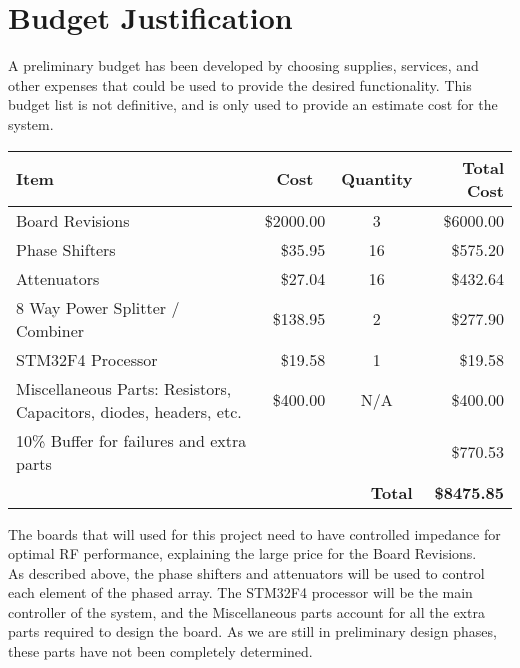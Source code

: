 \documentclass[UROP.tex]{subfiles}
\begin{document}
\bigskip
\section{\Large Budget Justification}
	A preliminary budget has been developed by choosing supplies, services, and other expenses that could be used to provide the desired functionality.  This budget list is not definitive, and is only used to provide an estimate cost for the system.\\
\begin{table}[H]
\doublespacing
\centering
\begin{tabular}{| p{7cm} | r | c | r |}
\hline
  Item & \multicolumn{1}{|c|}{Cost} & Quantity & Total Cost \\\hline\hline
  Board Revisions & \$2000.00 & 3 & \$6000.00  \\
  Phase Shifters & \$35.95 & 16 & \$575.20\\
  Attenuators & \$27.04 & 16 & \$432.64 \\
  8 Way Power Splitter / Combiner & \$138.95 & 2 & \$277.90 \\
  STM32F4 Processor & \$19.58 & 1 & \$19.58\\
  Miscellaneous Parts: Resistors, Capacitors, diodes, headers, etc. & \$400.00 & N/A & \$400.00\\
  10\% Buffer for failures and extra parts & & &\$770.53\\\hline
  \multicolumn{3}{r}{\textbf{Total}} & \multicolumn{1}{r}{\textbf{\$8475.85}}
 
 \end{tabular}
\end{table}

The boards that will used for this project need to have controlled impedance for optimal RF performance, explaining the large price for the Board Revisions.\\

As described above, the phase shifters and attenuators will be used to control each element of the phased array.  The STM32F4 processor will be the main controller of the system, and the Miscellaneous parts account for all the extra parts required to design the board.  As we are still in preliminary design phases, these parts have not been completely determined.
\end{document}
